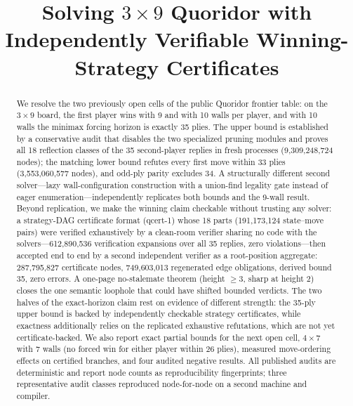 \documentclass[conference]{IEEEtran}
\begin{document}
\title{Solving $3\times 9$ Quoridor with Independently Verifiable Winning-Strategy Certificates}

\author{%
}

\maketitle

\begin{abstract}
We resolve the two previously open cells of the public Quoridor frontier table: on the $3\times 9$ board, the first player wins with 9 and with 10 walls per player, and with 10 walls the minimax forcing horizon is exactly 35 plies. The upper bound is established by a conservative audit that disables the two specialized pruning modules and proves all 18 reflection classes of the 35 second-player replies in fresh processes (9{,}309{,}248{,}724 nodes); the matching lower bound refutes every first move within 33 plies (3{,}553{,}060{,}577 nodes), and odd-ply parity excludes 34. A structurally different second solver---lazy wall-configuration construction with a union-find legality gate instead of eager enumeration---independently replicates both bounds and the 9-wall result. Beyond replication, we make the winning claim checkable without trusting any solver: a strategy-DAG certificate format (\textsf{qcert-1}) whose 18 parts (191{,}173{,}124 state--move pairs) were verified exhaustively by a clean-room verifier sharing no code with the solvers---612{,}890{,}536 verification expansions over all 35 replies, zero violations---then accepted end to end by a second independent verifier as a root-position aggregate: 287{,}795{,}827 certificate nodes, 749{,}603{,}013 regenerated edge obligations, derived bound 35, zero errors. A one-page no-stalemate theorem (height $\geq 3$, sharp at height 2) closes the one semantic loophole that could have shifted bounded verdicts. The two halves of the exact-horizon claim rest on evidence of different strength: the 35-ply upper bound is backed by independently checkable strategy certificates, while exactness additionally relies on the replicated exhaustive refutations, which are not yet certificate-backed. We also report exact partial bounds for the next open cell, $4\times 7$ with 7 walls (no forced win for either player within 26 plies), measured move-ordering effects on certified branches, and four audited negative results. All published audits are deterministic and report node counts as reproducibility fingerprints; three representative audit classes reproduced node-for-node on a second machine and compiler.
\end{abstract}
\end{document}
